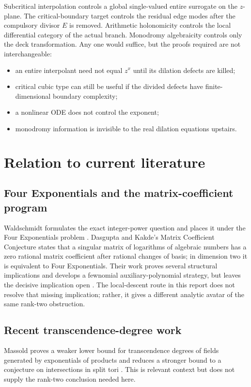 \documentclass[11pt,oneside]{article}
\theoremstyle{definition}
\theoremstyle{remark}
\begin{document}
Subcritical interpolation controls a global single-valued entire surrogate on the \(z\)-plane.  The critical-boundary target controls the residual edge modes after the compulsory divisor \(E\) is removed.  Arithmetic holonomicity controls the local differential category of the actual branch.  Monodromy algebraicity controls only the deck transformation.  Any one would suffice, but the proofs required are not interchangeable:
\begin{itemize}
\item an entire interpolant need not equal \(z^x\) until its dilation defects are killed;
\item critical cubic type can still be useful if the divided defects have finite-dimensional boundary complexity;
\item a nonlinear ODE does not control the exponent;
\item monodromy information is invisible to the real dilation equations upstairs.
\end{itemize}

\section{Relation to current literature}

\subsection{Four Exponentials and the matrix-coefficient program}

Waldschmidt formulates the exact integer-power question and places it under the Four Exponentials problem \cite{Waldschmidt2023}.  Dasgupta and Kakde's Matrix Coefficient Conjecture states that a singular matrix of logarithms of algebraic numbers has a zero rational matrix coefficient after rational changes of basis; in dimension two it is equivalent to Four Exponentials.  Their work proves several structural implications and develops a fewnomial auxiliary-polynomial strategy, but leaves the decisive implication open \cite{DasguptaKakde2026}.  The local-descent route in this report does not resolve that missing implication; rather, it gives a different analytic avatar of the same rank-two obstruction.

\subsection{Recent transcendence-degree work}

Massold proves a weaker lower bound for transcendence degrees of fields generated by exponentials of products and reduces a stronger bound to a conjecture on intersections in split tori \cite{Massold2025}.  This is relevant context but does not supply the rank-two conclusion needed here.
\end{document}
